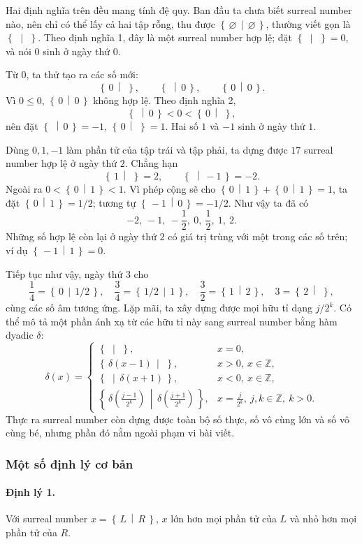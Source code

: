 \documentclass[11pt]{article}
\newcommand{\Gpos}[2]{\left\{\,#1\,\middle|\,#2\,\right\}}
\begin{document}
Hai định nghĩa trên đều mang tính đệ quy. Ban đầu ta chưa biết surreal number
nào, nên chỉ có thể lấy cả hai tập rỗng, thu được \(\Gpos{\varnothing}
{\varnothing}\), thường viết gọn là \(\Gpos{}{}\). Theo định nghĩa 1, đây là
một surreal number hợp lệ; đặt \(\Gpos{}{}=0\), và nói \(0\) sinh ở ngày thứ
\(0\).

Từ \(0\), ta thử tạo ra các số mới:
\[
  \Gpos{0}{},\qquad \Gpos{}{0},\qquad \Gpos{0}{0}.
\]
Vì \(0\le 0\), \(\Gpos{0}{0}\) không hợp lệ. Theo định nghĩa 2,
\[
  \Gpos{}{0}<0<\Gpos{0}{},
\]
nên đặt \(\Gpos{}{0}=-1\), \(\Gpos{0}{}=1\). Hai số \(1\) và \(-1\) sinh ở
ngày thứ \(1\).

Dùng \(0,1,-1\) làm phần tử của tập trái và tập phải, ta dựng được \(17\)
surreal number hợp lệ ở ngày thứ \(2\). Chẳng hạn
\[
  \Gpos{1}{}=2,\qquad \Gpos{}{-1}=-2.
\]
Ngoài ra \(0<\Gpos{0}{1}<1\). Vì phép cộng sẽ cho
\(\Gpos{0}{1}+\Gpos{0}{1}=1\), ta đặt \(\Gpos{0}{1}=1/2\); tương tự
\(\Gpos{-1}{0}=-1/2\). Như vậy ta đã có
\[
  -2,\ -1,\ -\frac12,\ 0,\ \frac12,\ 1,\ 2.
\]
Những số hợp lệ còn lại ở ngày thứ \(2\) có giá trị trùng với một trong các
số trên; ví dụ \(\Gpos{-1}{1}=0\).

Tiếp tục như vậy, ngày thứ \(3\) cho
\[
  \frac14=\Gpos{0}{1/2},\quad
  \frac34=\Gpos{1/2}{1},\quad
  \frac32=\Gpos{1}{2},\quad
  3=\Gpos{2}{},
\]
cùng các số âm tương ứng. Lặp mãi, ta xây dựng được mọi hữu tỉ dạng
\(j/2^k\). Có thể mô tả một phần ánh xạ từ các hữu tỉ này sang surreal number
bằng hàm dyadic \(\delta\):
\[
\delta(x)=
\begin{cases}
  \Gpos{}{}, & x=0,\\
  \Gpos{\delta(x-1)}{}, & x>0,\ x\in\mathbb{Z},\\
  \Gpos{}{\delta(x+1)}, & x<0,\ x\in\mathbb{Z},\\
  \Gpos{\delta\!\left(\frac{j-1}{2^k}\right)}
        {\delta\!\left(\frac{j+1}{2^k}\right)}, &
  x=\frac{j}{2^k},\ j,k\in\mathbb{Z},\ k>0.
\end{cases}
\]
Thực ra surreal number còn dựng được toàn bộ số thực, số vô cùng lớn và số vô
cùng bé, nhưng phần đó nằm ngoài phạm vi bài viết.

\subsubsection{Một số định lý cơ bản}

\paragraph{Định lý 1.}
Với surreal number \(x=\Gpos{L}{R}\), \(x\) lớn hơn mọi phần tử của \(L\) và
nhỏ hơn mọi phần tử của \(R\).
\end{document}
